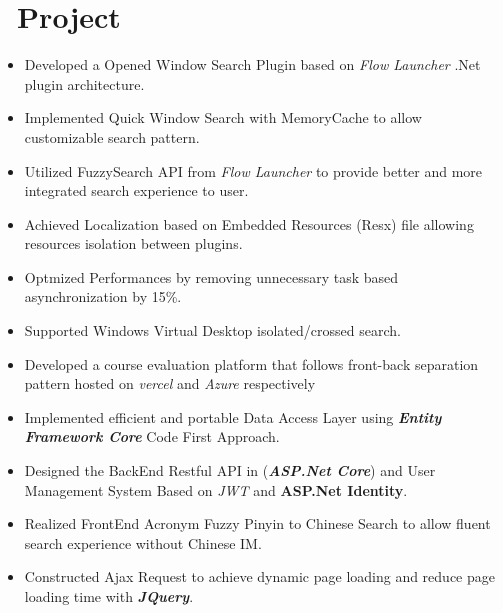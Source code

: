 \documentclass{resume}
\begin{document}
\section{\texorpdfstring{\faList}{}\ Project}

\begin{itemize}
  \item Developed a Opened Window Search Plugin based on \textit{Flow Launcher} .Net plugin architecture.
  \item Implemented Quick Window Search with MemoryCache to allow customizable search pattern.
  \item Utilized FuzzySearch API from \textit{Flow Launcher} to provide better and more integrated search experience to user.
  \item Achieved Localization based on Embedded Resources (Resx) file allowing resources isolation between plugins.
  \item Optmized Performances by removing unnecessary task based asynchronization by 15\%.
  \item Supported Windows Virtual Desktop isolated/crossed search.
\end{itemize}



\begin{itemize}
  \item Developed a course evaluation platform that follows front-back separation pattern hosted on \textit{vercel} and \textit{Azure} respectively
  \item Implemented efficient and portable Data Access Layer using \textbf{\textit{Entity Framework Core}} Code First Approach.
  \item Designed the BackEnd Restful API in (\textbf{\textit{ASP.Net Core}}) and User Management System Based on \textit{JWT} and \textbf{ASP.Net Identity}.
  \item Realized FrontEnd Acronym Fuzzy Pinyin to Chinese Search to allow fluent search experience without Chinese IM.
  \item Constructed Ajax Request to achieve dynamic page loading and reduce page loading time with \textbf{\textit{JQuery}}.
\end{itemize}


\end{document}
